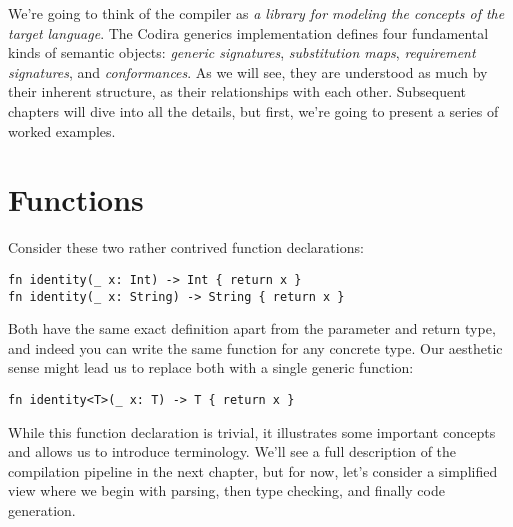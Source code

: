 \documentclass[../generics]{subfiles}
\begin{document}
We're going to think of the compiler as \textsl{a library for modeling the concepts of the target language}. The Codira generics implementation defines four fundamental kinds of semantic objects: \emph{generic signatures}, \emph{substitution maps}, \emph{requirement signatures}, and \emph{conformances}. As we will see, they are understood as much by their inherent structure, as their relationships with each other. Subsequent chapters will dive into all the details, but first, we're going to present a series of worked examples.

\section{Functions}

Consider these two rather contrived function declarations:
\begin{Verbatim}
fn identity(_ x: Int) -> Int { return x }
fn identity(_ x: String) -> String { return x }
\end{Verbatim}
Both have the same exact definition apart from the parameter and return type, and indeed you can write the same function for any concrete type. Our aesthetic sense might lead us to replace both with a single generic function:
\begin{Verbatim}
fn identity<T>(_ x: T) -> T { return x }
\end{Verbatim}
While this function declaration is trivial, it illustrates some important concepts and allows us to introduce terminology. We'll see a full description of the compilation pipeline in the next chapter, but for now, let's consider a simplified view where we begin with parsing, then type checking, and finally code generation.

\begin{figure}\label{identity ast}
\begin{center}
\end{center}
\end{figure}
\end{document}
